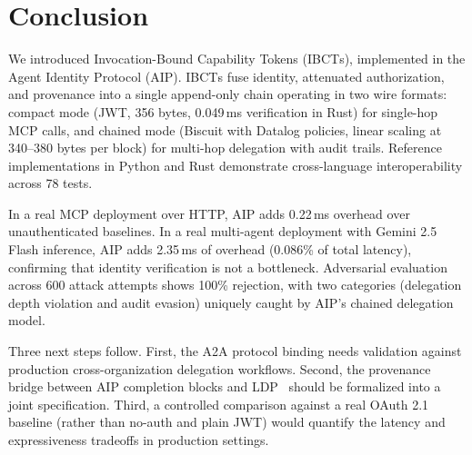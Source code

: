 \documentclass[11pt,a4paper]{article}
\newcommand{\aip}{\textsc{AIP}}
\newcommand{\ibct}{\textsc{IBCT}}
\newcommand{\ldp}{\textsc{LDP}}
\newcommand{\atoa}{\textsc{A2A}}
\newcommand{\mcp}{\textsc{MCP}}
\begin{document}
\section{Conclusion}
\label{sec:conclusion}

We introduced Invocation-Bound Capability Tokens (\ibct{}s), implemented in the Agent Identity Protocol (\aip{}). \ibct{}s fuse identity, attenuated authorization, and provenance into a single append-only chain operating in two wire formats: compact mode (JWT, 356 bytes, 0.049\,ms verification in Rust) for single-hop \mcp{} calls, and chained mode (Biscuit with Datalog policies, linear scaling at 340--380 bytes per block) for multi-hop delegation with audit trails. Reference implementations in Python and Rust demonstrate cross-language interoperability across 78 tests.

In a real MCP deployment over HTTP, \aip{} adds 0.22\,ms overhead over unauthenticated baselines. In a real multi-agent deployment with Gemini 2.5 Flash inference, \aip{} adds 2.35\,ms of overhead (0.086\% of total latency), confirming that identity verification is not a bottleneck. Adversarial evaluation across 600 attack attempts shows 100\% rejection, with two categories (delegation depth violation and audit evasion) uniquely caught by \aip{}'s chained delegation model.

Three next steps follow. First, the \atoa{} protocol binding needs validation against production cross-organization delegation workflows. Second, the provenance bridge between \aip{} completion blocks and \ldp{}~\citep{prakash2025ldp} should be formalized into a joint specification. Third, a controlled comparison against a real OAuth 2.1 baseline (rather than no-auth and plain JWT) would quantify the latency and expressiveness tradeoffs in production settings.
\end{document}
